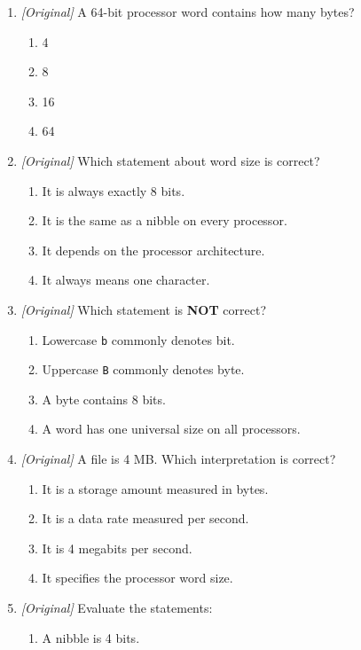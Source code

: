 \documentclass[11pt]{article}
\begin{document}
\begin{enumerate}[label=\textbf{Q\arabic*.}, leftmargin=*]
\begin{enumerate}[label=\Alph*.]
    \item 0.125 MB/s
  \end{enumerate}
\item \textit{[Original]} A 64-bit processor word contains how many bytes?
  \begin{enumerate}[label=\Alph*.]
    \item 4
    \item 8
    \item 16
    \item 64
  \end{enumerate}
\item \textit{[Original]} Which statement about word size is correct?
  \begin{enumerate}[label=\Alph*.]
    \item It is always exactly 8 bits.
    \item It is the same as a nibble on every processor.
    \item It depends on the processor architecture.
    \item It always means one character.
  \end{enumerate}
\item \textit{[Original]} Which statement is \textbf{NOT} correct?
  \begin{enumerate}[label=\Alph*.]
    \item Lowercase \texttt{b} commonly denotes bit.
    \item Uppercase \texttt{B} commonly denotes byte.
    \item A byte contains 8 bits.
    \item A word has one universal size on all processors.
  \end{enumerate}
\item \textit{[Original]} A file is 4 MB. Which interpretation is correct?
  \begin{enumerate}[label=\Alph*.]
    \item It is a storage amount measured in bytes.
    \item It is a data rate measured per second.
    \item It is 4 megabits per second.
    \item It specifies the processor word size.
  \end{enumerate}
\item \textit{[Original]} Evaluate the statements:
  \begin{enumerate}[label=\Roman*.]
    \item A nibble is 4 bits.

\end{enumerate}
\end{enumerate}
\end{document}
